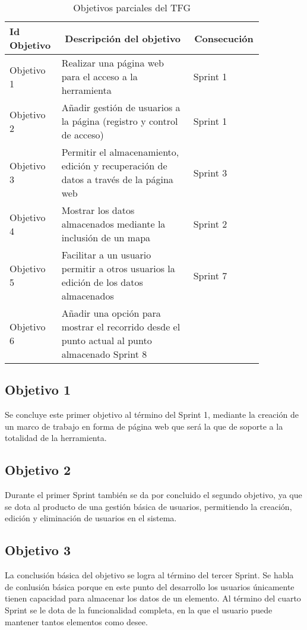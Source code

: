 \begin{table}[h!]
  \centering 
  \begin{tabular}{p{0.15\linewidth}p{0.5\linewidth}p{0.2\linewidth}}
    \multicolumn{1}{l}{\cellcolor{black!30}\textbf{Id Objetivo}} & 
 	\multicolumn{1}{c}{\cellcolor{black!30}\textbf{Descripción del objetivo}} &
 	\multicolumn{1}{c}{\cellcolor{black!30}\textbf{Consecución}}\\
    \toprule
    Objetivo 1 & Realizar una página web para el acceso a la herramienta & Sprint 1 \\
	Objetivo 2 & Añadir gestión de usuarios a la página (registro y control de acceso) & Sprint 1 \\
	Objetivo 3 & Permitir el almacenamiento, edición y recuperación de datos a través de la página web & Sprint 3 \\
	Objetivo 4 & Mostrar los datos almacenados mediante la inclusión de un mapa & Sprint 2 \\
	Objetivo 5 & Facilitar a un usuario permitir a otros usuarios la edición de los datos almacenados & Sprint 7\\
	Objetivo 6 & Añadir una opción para mostrar el recorrido desde el punto actual al punto almacenado Sprint 8\\
    \hline
  \end{tabular}
  \caption{Objetivos parciales del \ac{TFG}}
  \label{tab:objetivos2}
\end{table}

\subsection{Objetivo 1}
Se concluye este primer objetivo al término del Sprint 1, mediante la creación de un marco de trabajo en forma de página web que será la que de soporte a la totalidad de la herramienta.

\subsection{Objetivo 2}
Durante el primer Sprint también se da por concluido el segundo objetivo, ya que se dota al producto de una gestión básica de usuarios, permitiendo la creación, edición y eliminación de usuarios en el sistema.

\subsection{Objetivo 3}
La conclusión básica del objetivo se logra al término del tercer Sprint. Se habla de conlusión básica porque en este punto del desarrollo los usuarios únicamente tienen capacidad para almacenar los datos de un elemento. Al término del cuarto Sprint se le dota de la funcionalidad completa, en la que el usuario puede mantener tantos elementos como desee.

